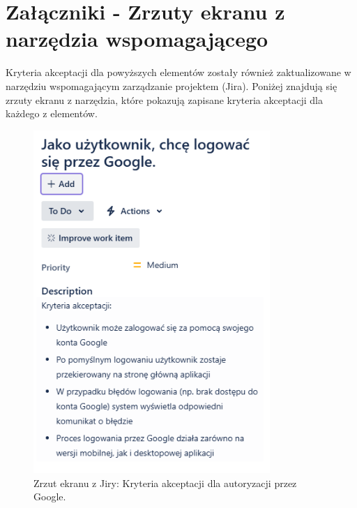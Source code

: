 \documentclass[12pt,a4paper,colorlinks=true,linkcolor=NavyBlue,citecolor=red,urlcolor=NavyBlue]{book}
\begin{document}
\section{Załączniki - Zrzuty ekranu z narzędzia wspomagającego}
Kryteria akceptacji dla powyższych elementów zostały również zaktualizowane w narzędziu wspomagającym zarządzanie projektem (Jira). Poniżej znajdują się zrzuty ekranu z narzędzia, które pokazują zapisane kryteria akceptacji dla każdego z elementów.

\begin{figure}[h!]
\centering
\includegraphics[width=0.8\textwidth]{kryteria_google.png}
\caption{Zrzut ekranu z Jiry: Kryteria akceptacji dla autoryzacji przez Google.}
\end{figure}
\end{document}
